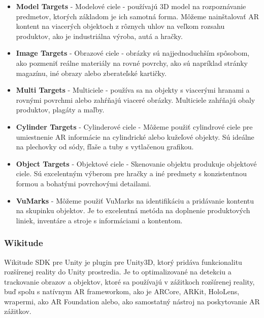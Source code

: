 \begin{itemize}
    \item \textbf{Model Targets} - Modelové ciele - používajú 3D model na rozpoznávanie predmetov, ktorých základom je ich samotná forma. Môžeme nainštalovať AR kontent na viacerých objektoch z rôznych uhlov na veľkom rozsahu produktov, ako je industriálna výroba, autá a hračky.
    
    \item \textbf{Image Targets} - Obrazové ciele - obrázky sú najjednoduchším spôsobom, ako pozmeniť reálne materiály na rovné povrchy, ako sú napríklad stránky magazínu, iné obrazy alebo zberateľské kartičky.
    
    \item \textbf{Multi Targets} - Multiciele - používa sa na objekty s viacerými hranami a rovnými povrchmi alebo zahŕňajú viaceré obrázky. Multiciele zahŕňajú obaly produktov, plagáty a maľby.
    
    \item \textbf{Cylinder Targets} - Cylinderové ciele -  Môžeme použiť cylindrové ciele pre umiestnenie AR informácie na cylindrické alebo kužeľové objekty. Sú ideálne na plechovky od sódy, fľaše a tuby s vytlačenou grafikou.
    
    \item \textbf{Object Targets} - Objektové ciele - Skenovanie objektu produkuje objektové ciele. Sú excelentným výberom pre hračky a iné predmety s konzistentnou formou a bohatými povrchovými detailami. 
    
    \item \textbf{VuMarks} - Môžeme použiť VuMarks na identifikáciu a pridávanie kontentu na skupinku objektov. Je to excelentná metóda na doplnenie produktových liniek, inventáre a stroje s informáciami a kontentom. 
\end{itemize}

\cite{anand2024vuforia}

\subsubsection{Wikitude}

Wikitude SDK pre Unity je plugin pre Unity3D, ktorý pridáva funkcionalitu rozšírenej reality do Unity prostredia. Je to optimalizované na detekciu a trackovanie obrazov a objektov, ktoré sa používajú v zážitkoch rozšírenej reality, buď spolu s natívnym AR frameworkom, ako je ARCore, ARKit, HoloLens, wrapermi, ako AR Foundation alebo, ako samostatný nástroj na poskytovanie AR zážitkov.

